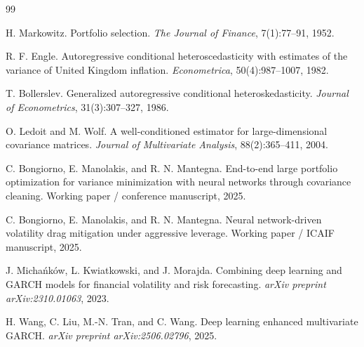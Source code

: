 \documentclass[11pt,a4paper]{article}
\begin{document}
\begin{thebibliography}{99}

H. Markowitz.
\newblock Portfolio selection.
\newblock \emph{The Journal of Finance}, 7(1):77--91, 1952.

R. F. Engle.
\newblock Autoregressive conditional heteroscedasticity with estimates of the variance of United Kingdom inflation.
\newblock \emph{Econometrica}, 50(4):987--1007, 1982.

T. Bollerslev.
\newblock Generalized autoregressive conditional heteroskedasticity.
\newblock \emph{Journal of Econometrics}, 31(3):307--327, 1986.

O. Ledoit and M. Wolf.
\newblock A well-conditioned estimator for large-dimensional covariance matrices.
\newblock \emph{Journal of Multivariate Analysis}, 88(2):365--411, 2004.

C. Bongiorno, E. Manolakis, and R. N. Mantegna.
\newblock End-to-end large portfolio optimization for variance minimization with neural networks through covariance cleaning.
\newblock Working paper / conference manuscript, 2025.

C. Bongiorno, E. Manolakis, and R. N. Mantegna.
\newblock Neural network-driven volatility drag mitigation under aggressive leverage.
\newblock Working paper / ICAIF manuscript, 2025.

J. Micha\'nk\'ow, L. Kwiatkowski, and J. Morajda.
\newblock Combining deep learning and GARCH models for financial volatility and risk forecasting.
\newblock \emph{arXiv preprint arXiv:2310.01063}, 2023.

H. Wang, C. Liu, M.-N. Tran, and C. Wang.
\newblock Deep learning enhanced multivariate GARCH.
\newblock \emph{arXiv preprint arXiv:2506.02796}, 2025.

\end{thebibliography}
\end{document}
